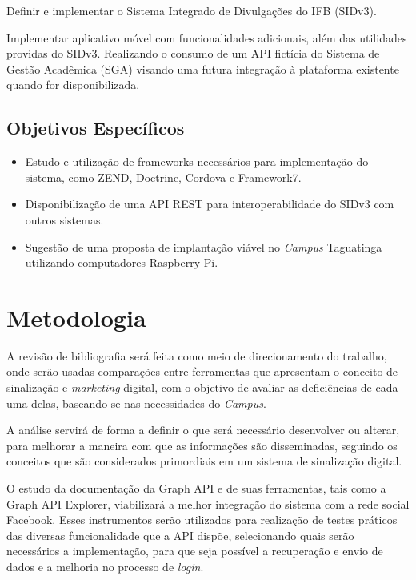 Definir e implementar o Sistema Integrado de Divulgações do IFB (SIDv3).

Implementar aplicativo móvel com funcionalidades adicionais, além das utilidades providas do SIDv3. Realizando o consumo de um API fictícia do Sistema de Gestão Acadêmica (SGA) visando uma futura integração à plataforma existente quando for disponibilizada.

\subsection{Objetivos Específicos}
	 \begin{itemize}
	\item Estudo e utilização de frameworks necessários para implementação do sistema, como ZEND, Doctrine, Cordova e Framework7.
	 	
	\item Disponibilização de uma API REST para interoperabilidade do SIDv3 com outros sistemas.
	
	\item Sugestão de uma proposta de implantação viável no \textit{Campus} Taguatinga utilizando computadores Raspberry Pi.
	\end{itemize}
	
\section{Metodologia}
A revisão de bibliografia será feita como meio de direcionamento do trabalho, onde serão usadas comparações entre ferramentas que apresentam o conceito de sinalização e \textit{marketing} digital, com o objetivo de avaliar as deficiências de cada uma delas, baseando-se nas necessidades do \textit{Campus}.

A análise servirá de forma a definir o que será necessário desenvolver ou alterar, para melhorar a maneira com que as informações são disseminadas, seguindo os conceitos que são considerados primordiais em um sistema de sinalização digital.

O estudo da documentação da Graph API e de suas ferramentas, tais como a Graph API Explorer, viabilizará a melhor integração do sistema com a rede social Facebook. Esses instrumentos serão utilizados para realização de testes práticos das diversas funcionalidade que a API dispõe, selecionando quais serão necessários a implementação, para que seja possível a recuperação e envio de dados e a melhoria no processo de \textit{login}.
	 
